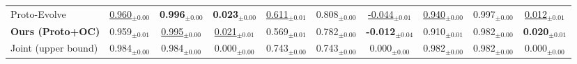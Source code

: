 \begin{table}[t]
\begin{tabular}{lccccccccc}
Proto-Evolve & \underline{0.960}$_{\pm0.00}$ & \textbf{0.996}$_{\pm0.00}$ & \textbf{0.023}$_{\pm0.00}$ & \underline{0.611}$_{\pm0.01}$ & 0.808$_{\pm0.00}$ & \underline{-0.044}$_{\pm0.01}$ & \underline{0.940}$_{\pm0.00}$ & 0.997$_{\pm0.00}$ & \underline{0.012}$_{\pm0.01}$ \\
\textbf{Ours (Proto+OC)} & 0.959$_{\pm0.01}$ & \underline{0.995}$_{\pm0.00}$ & \underline{0.021}$_{\pm0.01}$ & 0.569$_{\pm0.01}$ & 0.782$_{\pm0.00}$ & \textbf{-0.012}$_{\pm0.04}$ & 0.910$_{\pm0.01}$ & 0.982$_{\pm0.00}$ & \textbf{0.020}$_{\pm0.01}$ \\
\midrule
Joint (upper bound) & 0.984$_{\pm0.00}$ & 0.984$_{\pm0.00}$ & 0.000$_{\pm0.00}$ & 0.743$_{\pm0.00}$ & 0.743$_{\pm0.00}$ & 0.000$_{\pm0.00}$ & 0.982$_{\pm0.00}$ & 0.982$_{\pm0.00}$ & 0.000$_{\pm0.00}$ \\
\bottomrule\end{tabular}\end{table}

